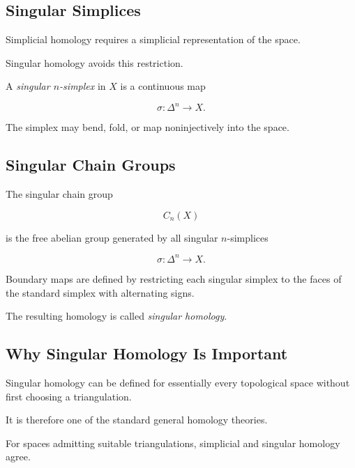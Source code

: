 \subsection{Singular Simplices}
\label{subsec:singular-simplices}

Simplicial homology requires a simplicial representation of the space.

Singular homology avoids this restriction.

A \emph{singular \(n\)-simplex} in \(X\) is a continuous map

\[
\boxed{
\sigma:\Delta^n\to X.
}
\]

The simplex may bend, fold, or map noninjectively into the space.

\subsection{Singular Chain Groups}
\label{subsec:singular-chain-groups}

The singular chain group

\[
\boxed{
C_n(X)
}
\]

is the free abelian group generated by all singular \(n\)-simplices

\[
\sigma:\Delta^n\to X.
\]

Boundary maps are defined by restricting each singular simplex to the faces
of the standard simplex with alternating signs.

The resulting homology is called \emph{singular homology}.

\subsection{Why Singular Homology Is Important}
\label{subsec:why-singular-homology}

Singular homology can be defined for essentially every topological space
without first choosing a triangulation.

It is therefore one of the standard general homology theories.

For spaces admitting suitable triangulations, simplicial and singular
homology agree.


